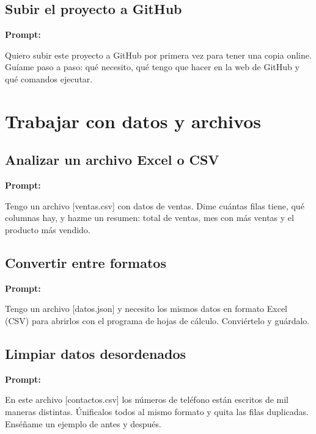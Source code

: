 \documentclass[11pt,a4paper]{report}
\begin{document}
\subsection{Subir el proyecto a GitHub}

\noindent\textbf{Prompt: }
\begin{codebox}
Quiero subir este proyecto a GitHub por primera vez para tener una copia online. Guíame paso a paso: qué necesito, qué tengo que hacer en la web de GitHub y qué comandos ejecutar.
\end{codebox}

\section{ Trabajar con datos y archivos}

\subsection{Analizar un archivo Excel o CSV}

\noindent\textbf{Prompt: }
\begin{codebox}
Tengo un archivo [ventas.csv] con datos de ventas. Dime cuántas filas tiene, qué columnas hay, y hazme un resumen: total de ventas, mes con más ventas y el producto más vendido.
\end{codebox}

\subsection{Convertir entre formatos}

\noindent\textbf{Prompt: }
\begin{codebox}
Tengo un archivo [datos.json] y necesito los mismos datos en formato Excel (CSV) para abrirlos con el programa de hojas de cálculo. Conviértelo y guárdalo.
\end{codebox}

\subsection{Limpiar datos desordenados}

\noindent\textbf{Prompt: }
\begin{codebox}
En este archivo [contactos.csv] los números de teléfono están escritos de mil maneras distintas. Únificalos todos al mismo formato y quita las filas duplicadas. Enséñame un ejemplo de antes y después.
\end{codebox}
\end{document}
